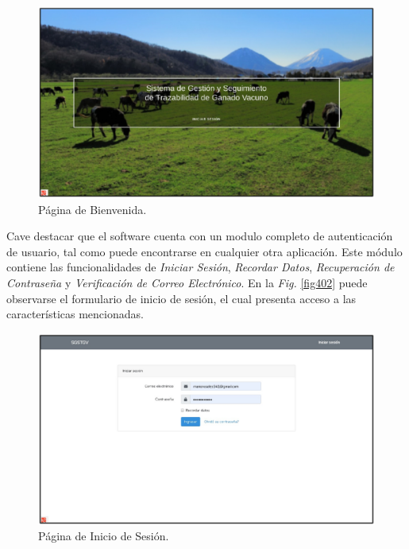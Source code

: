 \documentclass[11pt,oneside]{book}
\begin{document}
\begin{figure}[tbhp]
\centerline{\includegraphics[scale=0.87]{figs/capitulo_4_desarrollo/fig401.pdf}}
\caption{Página de Bienvenida.}
\label{fig401}
\end{figure}

\newpage
Cave destacar que el software cuenta con un modulo completo de autenticación de usuario, tal como puede encontrarse en cualquier otra aplicación. Este módulo contiene las funcionalidades de \textit{Iniciar Sesión}, \textit{Recordar Datos}, \textit{Recuperación de Contraseña} y \textit{Verificación de Correo Electrónico}. En la \textit{Fig.} \eqref{fig402} puede observarse el formulario de inicio de sesión, el cual presenta acceso a las características mencionadas.

\begin{figure}[tbhp]
\centerline{\includegraphics[scale=0.87]{figs/capitulo_4_desarrollo/fig402.pdf}}
\caption{Página de Inicio de Sesión.}
\label{fig402}
\end{figure}
\end{document}
